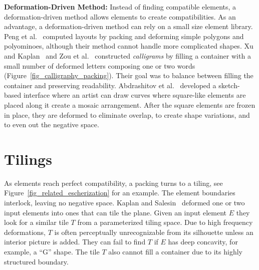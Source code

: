 \newtext
{
\textbf{Deformation-Driven Method:}
Instead of finding compatible elements,
a deformation-driven method allows elements to create compatibilities.
As an advantage, a deformation-driven method can rely on a small size element library.
Peng et al.~\cite{Peng2014} computed layouts by packing and deforming
simple polygons and polyominoes, although their method cannot handle more
complicated shapes.
Xu and Kaplan~\cite{Xu2007} and Zou et al.~\cite{Zou2016}
constructed \textit{calligrams} by filling a container with a small
number of deformed letters composing one or two words (Figure~\ref{fig_calligraphy_packing}).  
Their goal was to balance between filling the container and preserving readability.
Abdrashitov et al.~\cite{Abdrashitov2014} developed
a sketch-based interface where an artist can draw curves where square-like elements are placed along it
create a mosaic arrangement.
After the square elements are frozen in place, 
they are deformed to eliminate overlap, to create shape variations, 
and to even out the negative space.  
}




\section{Tilings}

\newtext
{
As elements reach perfect compatibility, a packing turns to a tiling, see Figure~\ref{fig_related_escherization} for an example.
The element boundaries interlock, leaving no negative space.
Kaplan and Salesin~\cite{Kaplan2000, Kaplan2004} deformed one or two 
input elements into ones that can tile the plane.
Given an input element $E$ they look for a similar tile $T$
from a parameterized tiling space.
Due to high frequency deformations,
$T$ is often perceptually unrecognizable from its silhouette unless an interior picture is added.
They can fail to find $T$ if $E$ has deep concavity, for example, a ``G'' shape.
The tile $T$ also cannot fill a container due to its highly structured boundary.
}

